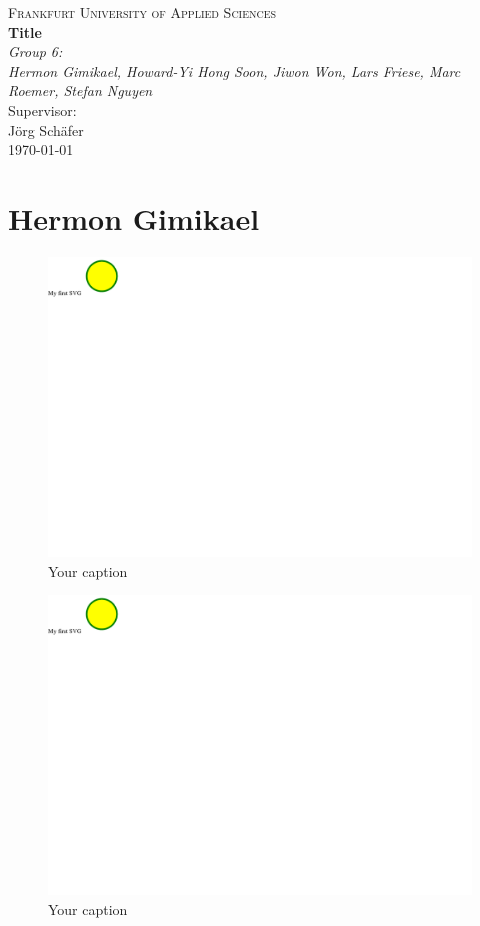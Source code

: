 \documentclass{article}
\begin{document}
\begin{titlepage}
    \centering
    \vspace*{0cm}
    {\scshape\Large Frankfurt University of Applied Sciences}\\[3cm]
    {\huge\bfseries Title}\\[5cm]
    {\Large\itshape Group 6:}\\
    {\Large\itshape Hermon Gimikael, Howard-Yi Hong Soon, Jiwon Won, Lars Friese, Marc Roemer, Stefan Nguyen}\\[4cm]
    Supervisor:\\
    Jörg Schäfer\\[3cm]
    {\large \today}
\end{titlepage}

\tableofcontents
\newpage

\section{Hermon Gimikael}
\begin{figure}[h!]
    \centering
    \captionsetup{labelformat=empty}
    \caption{Your caption}
    \includegraphics[width=\textwidth, angle=0]{Kreis2.pdf}
\end{figure}
\newpage
\begin{figure}[h!]
    \centering
    \captionsetup{labelformat=empty}
    \caption{Your caption}
    \includegraphics[width=\textwidth, angle=0]{Kreis2.pdf}
\end{figure}
\newpage
\end{document}
